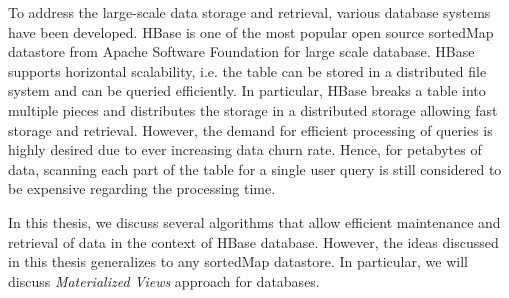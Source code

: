 \documentclass[11pt,a4paper,bibtotoc,idxtotoc,headsepline,footsepline,footexclude,BCOR12mm,DIV13]{scrbook}
\begin{document}
To address the large-scale data storage and retrieval, various database systems have been developed. HBase is one of the most popular open source sortedMap datastore from Apache Software Foundation for large scale database. HBase supports horizontal scalability, i.e. the table can be stored in a distributed file system and can be queried  efficiently. In particular, HBase breaks a table into multiple pieces and distributes the storage in a distributed storage allowing fast storage and retrieval.  However, the demand for efficient processing of queries is highly desired due to ever increasing data churn rate. Hence, for petabytes of data, scanning each part of the table for a single user query is still considered to be expensive regarding the processing time. 

In this thesis, we discuss several algorithms that allow efficient maintenance and retrieval of data in the context of HBase database. However, the ideas discussed in this thesis generalizes to any sortedMap datastore. In particular, we will  discuss 
\emph{Materialized  Views} approach for databases.


\end{document}
